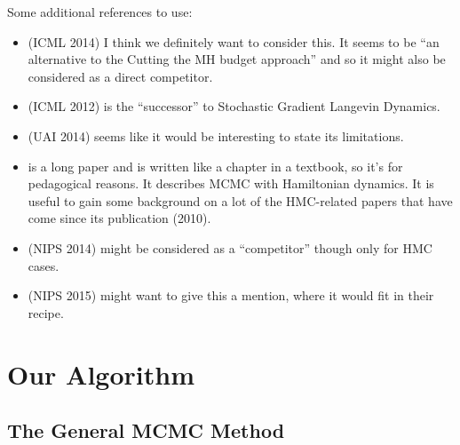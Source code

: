\documentclass{article}
\begin{document}
Some additional references to use:

\begin{itemize}
    \item \cite{icml2014c1_bardenet14} (ICML 2014) I think we definitely want to consider this. It
    seems to be ``an alternative to the Cutting the MH budget approach'' and so it might also be
    considered as a direct competitor.
    \item \cite{conf/icml/AhnBW12} (ICML 2012) is the ``successor'' to Stochastic Gradient Langevin
    Dynamics.
    \item \cite{conf/uai/MaclaurinA14} (UAI 2014) seems like it would be interesting to state its
    limitations.
    \item \cite{mcmc_hamiltonian_2010} is a long paper and is written like a chapter in a textbook,
    so it's for pedagogical reasons. It describes MCMC with Hamiltonian dynamics. It is useful to
    gain some background on a lot of the HMC-related papers that have come since its publication
    (2010).
    \item \cite{stochastic_thermostats_2014} (NIPS 2014) might be considered as a ``competitor''
    though only for HMC cases.
    \item \cite{sgmcmc_2015} (NIPS 2015) might want to give this a mention, where it would fit in
    their recipe.
\end{itemize}



\section{Our Algorithm}\label{sec:our_algorithm}

\subsection{The General MCMC Method}\label{sec:general_mcmc}
\end{document}
